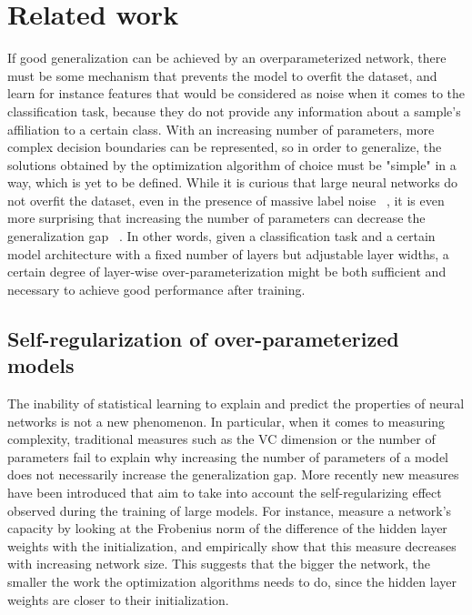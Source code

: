 \section{Related work}
If good generalization can be achieved by an overparameterized network, there must be some mechanism that prevents the model to overfit the dataset, and learn for instance features that would be considered as noise when it comes to the classification task, because they do not provide any information about a sample's affiliation to a certain class. With an increasing number of parameters, more complex decision boundaries can be represented, so in order to generalize, the solutions obtained by the optimization algorithm of choice must be "simple" in a way, which is yet to be defined. While it is curious that large neural networks do not overfit the dataset, even in the presence of massive label noise ~\autocite{rolnick2017deep}, it is even more surprising that increasing the number of parameters can decrease the generalization gap ~\autocite{neyshabur2018towards}. In other words, given a classification task and a certain model architecture with a fixed number of layers but adjustable layer widths, a certain degree of layer-wise over-parameterization might be both sufficient and necessary to achieve good performance after training. 

\subsection{Self-regularization of over-parameterized models}
The inability of statistical learning to explain and predict the properties of neural networks is not a new phenomenon. In particular, when it comes to measuring complexity, traditional measures such as the VC dimension or the number of parameters fail to explain why increasing the number of parameters of a model does not necessarily increase the generalization gap. More recently new measures have been introduced that aim to take into account the self-regularizing effect observed during the training of large models. For instance, \cite{neyshabur2018towards} 
 measure a network's capacity by looking at the Frobenius norm of the difference of the hidden layer weights with the initialization, and empirically show that this measure decreases with increasing network size. This suggests that the bigger the network, the smaller the work the optimization algorithms needs to do, since the hidden layer weights are closer to their initialization. \\

